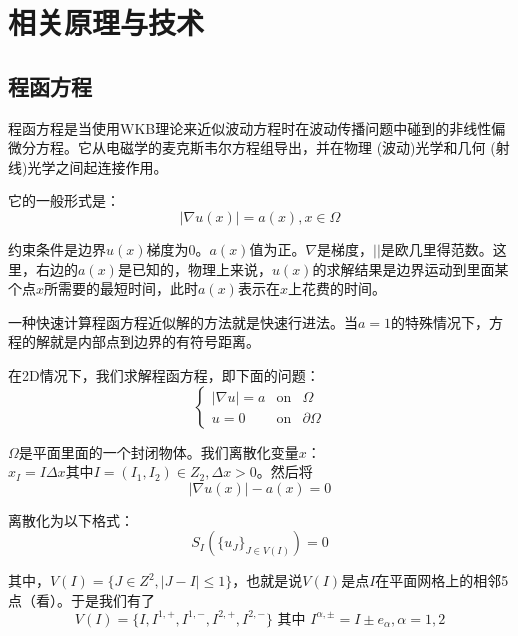 \chapter{相关原理与技术}
\label{technique}

\section{程函方程}
程函方程是当使用WKB理论来近似波动方程时在波动传播问题中碰到的非线性偏微分方程。它从电磁学的麦克斯韦尔方程组导出，并在物理 (波动)光学和几何 (射线)光学之间起连接作用。

它的一般形式是：
\begin{equation}
    \label{eikonal_equation_1}
    \left| \nabla u(x) \right| = a(x), x \in \Omega
\end{equation}

约束条件是边界$u(x)$梯度为0。$a(x)$值为正。$\nabla$是梯度，$\left| \right|$是欧几里得范数。这里，右边的$a(x)$是已知的，物理上来说，$u(x)$的求解结果是边界运动到里面某个点$x$所需要的最短时间，此时$a(x)$表示在$x$上花费的时间。

一种快速计算程函方程近似解的方法就是快速行进法。当$a = 1$的特殊情况下，方程的解就是内部点到边界的有符号距离。

在2D情况下，我们求解程函方程，即下面的问题：
\begin{equation*}
    \label{eikonal_equation_2}
    \left\{
    \begin{aligned}
    \left| \nabla u \right| = a & \mbox{on} & \Omega \\
    u = 0 & \mbox{on} &  \partial\Omega
    \end{aligned}
    \right.
\end{equation*}

$\Omega$是平面里面的一个封闭物体。我们离散化变量$x$：$x_{I} = I\Delta x\mbox{其中}I = (I_{1}, I_{2}) \in Z_{2}, \Delta x > 0$。然后将
\begin{equation*}
    \label{eikonal_equation_3}
    \left| \nabla u(x) \right| - a(x) = 0
\end{equation*}

离散化为以下格式：
\begin{equation*}
    \label{scheme}
    S_{I}(\{u_{J}\}_{J \in V(I)}) = 0
\end{equation*}

其中，$V(I) = \{J \in Z^{2}, \left| J - I \right| \leq 1\}$，也就是说$V(I)$是点$I$在平面网格上的相邻5点（看）。于是我们有了
\begin{equation*}
    \label{eikonal_equation_3}
    V(I) = \{I, I^{1, +}, I^{1, -}, I^{2, +}, I^{2, -}\} \mbox{ 其中 } I^{\alpha, \pm}  = I \pm e_{\alpha}, \alpha = 1, 2
\end{equation*}

